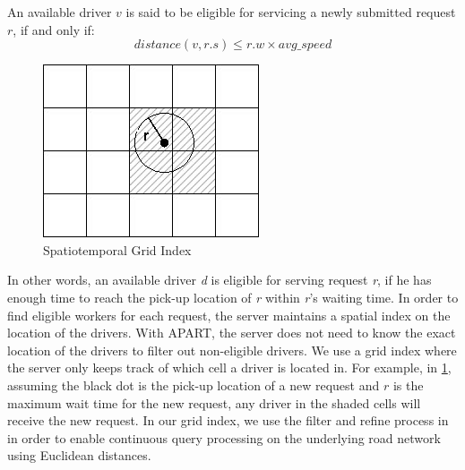 \begin{definition} 
An available driver $v$ is said to be eligible for servicing a newly submitted request $r$, if and only if:
\vspace{-2mm}
\begin{equation*}
distance(v, r.s) \leq r.w \times avg\_speed
\end{equation*}
\end{definition}

\vspace{-2mm}
\begin{figure}[!ht]
	\centering
	\includegraphics[width=0.65\columnwidth]{fig/grid_index}
	\vspace{-0mm}\caption{Spatiotemporal Grid Index} \vspace{-2mm} \label{fig:grid_index}
\end{figure}\vspace{-0mm}

\noindent In other words, an available driver \textit{d} is eligible for serving request \textit{r}, if he has enough time to reach the pick-up location of \textit{r} within \textit{r}'s waiting time. In order to find eligible workers for each request, the server maintains a spatial index on the location of the drivers. With APART, the server does not need to know the exact location of the drivers to filter out non-eligible drivers. We use a grid index where the server only keeps track of which cell a driver is located in. For example, in \cref{fig:grid_index}, assuming the black dot is the pick-up location of a new request and $r$ is the maximum wait time for the new request, any driver in the shaded cells will receive the new request. In our grid index, we use the filter and refine process in \cite{Demiryurek09} in order to enable continuous query processing on the underlying road network using Euclidean distances.

